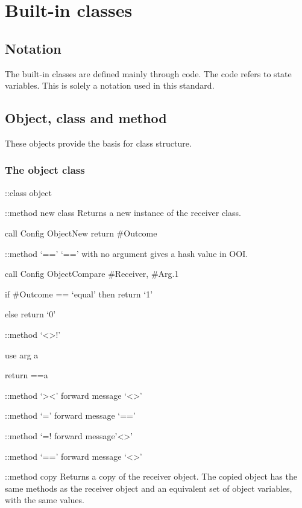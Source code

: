 \hypertarget{built-in-classes}{%
\chapter{Built-in classes}\label{built-in-classes}}

\hypertarget{notation}{%
\section{Notation}\label{notation}}

The built-in classes are defined mainly through code. The code refers to
state variables. This is solely a notation used in this standard.

\hypertarget{object-class-and-method}{%
\section{Object, class and method}\label{object-class-and-method}}

These objects provide the basis for class structure.

\hypertarget{the-object-class}{%
\subsection{The object class}\label{the-object-class}}

::class object

::method new class Returns a new instance of the receiver class.

call Config ObjectNew return \#Outcome

::method `==' `==' with no argument gives a hash value in OOI.

call Config ObjectCompare \#Receiver, \#Arg.1

if \#Outcome == `equal' then return `1'

else return `0'

::method `\textless\textgreater!'

use arg a

return \self==a

::method `\textgreater\textless{}' forward message
`\textless\textgreater{}'

::method `=' forward message `=='

::method `=! forward message'\textless\textgreater'

::method `==' forward message `\textless\textgreater{}'

::method copy Returns a copy of the receiver object. The copied object
has the same methods as the receiver object and an equivalent set of
object variables, with the same values.

